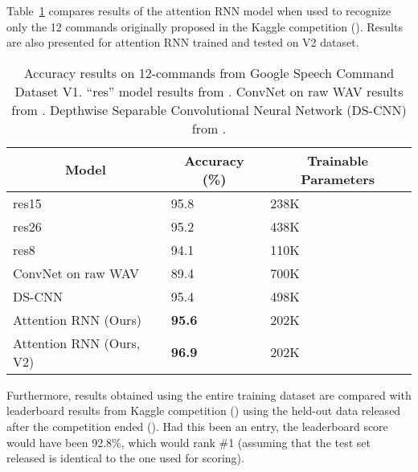 \documentclass[authoryear, review, 12pt, 3p]{elsarticle}
\begin{document}
Table~\ref{tblAccComp12} compares results of the attention RNN model when used to recognize only the 12 commands originally proposed in the Kaggle competition (\cite{TFSpRecChallenge}). Results are also presented for attention RNN trained and tested on V2 dataset.

\begin{table}[]
\centering
\caption{Accuracy results on 12-commands from Google Speech Command Dataset V1. ``res'' model results from \cite{DBLP:journals/corr/abs-1804-03209}. ConvNet on raw WAV results from \cite{Jansson2018}.  Depthwise Separable Convolutional Neural Network (DS-CNN) from \cite{DBLP:journals/corr/abs-1711-07128}. }
\label{tblAccComp12}
\begin{tabular}{|l|l|l|}
\hline
\multicolumn{1}{|c|}{\textbf{Model}} & \multicolumn{1}{c|}{\textbf{Accuracy (\%)}} & \multicolumn{1}{c|}{\textbf{Trainable Parameters}} \\ \hline
res15                                & 95.8                                        & 238K                                               \\ \hline
res26                                & 95.2                                        & 438K                                               \\ \hline
res8                                 & 94.1                                        & 110K                                               \\ \hline
ConvNet on raw WAV                                 & 89.4                                        & 700K                                               \\ \hline
DS-CNN                                 & 95.4                                        & 498K                                               \\ \hline
Attention RNN (Ours)                 & \textbf{95.6}                                        & 202K                                               \\ \hline
Attention RNN (Ours, V2)                 & \textbf{96.9}                                        & 202K                                               \\ \hline
\end{tabular}
\end{table}

Furthermore, results obtained using the entire training dataset are compared with leaderboard results from Kaggle competition (\cite{TFSpRecChallenge}) using the held-out data released after the competition ended (\cite{DBLP:journals/corr/abs-1804-03209}). Had this been an entry, the leaderboard score would have been 92.8\%, which would rank \#1 (assuming that the test set released is identical to the one used for scoring).
\end{document}
